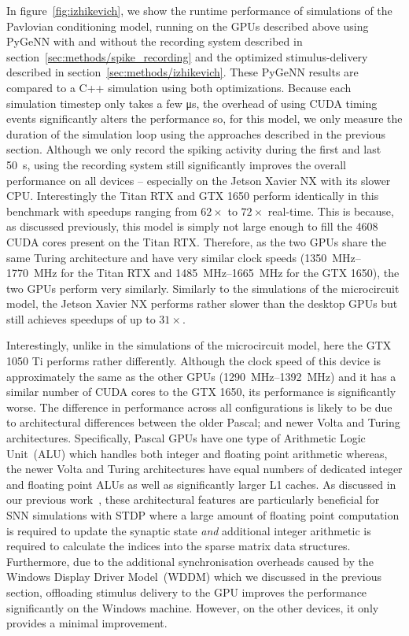 \documentclass[utf8]{frontiersSCNS} %
\begin{document}
In figure~\ref{fig:izhikevich}, we show the runtime performance of simulations of the Pavlovian conditioning model, running on the GPUs described above using PyGeNN with and without the recording system described in section~\ref{sec:methods/spike_recording} and the optimized stimulus-delivery described in section~\ref{sec:methods/izhikevich}. 
These PyGeNN results are compared to a C++ simulation using both optimizations.
Because each simulation timestep only takes a few \si{\micro\second}, the overhead of using CUDA timing events significantly alters the performance so, for this model, we only measure the duration of the simulation loop using the approaches described in the previous section.
Although we only record the spiking activity during the first and last \SI{50}{\second}, using the recording system still significantly improves the overall performance on all devices -- especially on the Jetson Xavier NX with its slower CPU.
Interestingly the Titan RTX and GTX 1650 perform identically in this benchmark with speedups ranging from $62\times$ to $72\times$ real-time.
This is because, as discussed previously, this model is simply not large enough to fill the \num{4608} CUDA cores present on the Titan RTX.
Therefore, as the two GPUs share the same Turing architecture and have very similar clock speeds (\SIrange{1350}{1770}{\mega\hertz} for the Titan RTX and \SIrange{1485}{1665}{\mega\hertz} for the GTX 1650), the two GPUs perform very similarly.
Similarly to the simulations of the microcircuit model, the Jetson Xavier NX performs rather slower than the desktop GPUs but still achieves speedups of up to $31\times$.

Interestingly, unlike in the simulations of the microcircuit model, here the GTX 1050 Ti performs rather differently. 
Although the clock speed of this device is approximately the same as the other GPUs (\SIrange{1290}{1392}{\mega\hertz}) and it has a similar number of CUDA cores to the GTX 1650, its performance is significantly worse.
The difference in performance across all configurations is likely to be due to architectural differences between the older Pascal; and newer Volta and Turing architectures.
Specifically, Pascal GPUs have one type of Arithmetic Logic Unit~(ALU) which handles both integer and floating point arithmetic whereas, the newer Volta and Turing architectures have equal numbers of dedicated integer and floating point ALUs as well as significantly larger L1 caches.
As discussed in our previous work~\citep{Knight2018}, these architectural features are particularly beneficial for SNN simulations with STDP where a large amount of floating point computation is required to update the synaptic state \emph{and} additional integer arithmetic is required to calculate the indices into the sparse matrix data structures.
Furthermore, due to the additional synchronisation overheads caused by the Windows Display Driver Model~(WDDM) which we discussed in the previous section, offloading stimulus delivery to the GPU improves the performance significantly on the Windows machine.
However, on the other devices, it only provides a minimal improvement.
\end{document}

